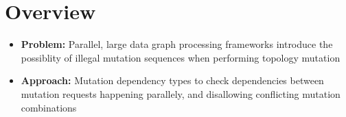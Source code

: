 \section{Overview}
\begin{frame}
\begin{itemize}
  \item \textbf{Problem:} Parallel, large data graph processing frameworks introduce the possiblity of illegal mutation sequences when performing topology mutation
  \newline
  \item \textbf{Approach:} Mutation dependency types to check dependencies between
  mutation requests happening parallely, and disallowing conflicting mutation combinations
\end{itemize}

\end{frame}